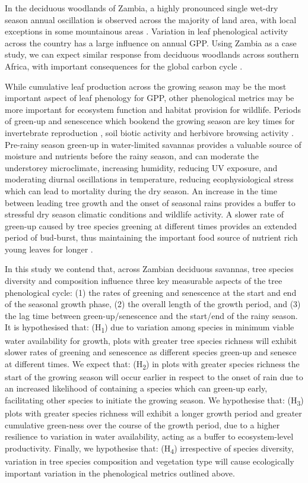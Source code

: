 \documentclass[11pt,a4paper]{article}
\begin{document}
In the deciduous woodlands of Zambia, a highly pronounced single wet-dry season annual oscillation is observed across the majority of land area, with local exceptions in some mountainous areas \citep{}. Variation in leaf phenological activity across the country has a large influence on annual GPP. Using Zambia as a case study, we can expect similar response from deciduous woodlands across southern Africa, with important consequences for the global carbon cycle \citep{}. 

While cumulative leaf production across the growing season may be the most
important aspect of leaf phenology for GPP, other phenological metrics may be
more important for ecosystem function and habitat provision for wildlife.
Periods of green-up and senescence which bookend the growing season are key
times for invertebrate reproduction \citep{}, soil biotic activity \citep{} and
herbivore browsing activity \citep{}. Pre-rainy season green-up in water-limited
savannas provides a valuable source of moisture and nutrients before the rainy
season, and can moderate the understorey microclimate, increasing humidity,
reducing UV exposure, and moderating diurnal oscillations in temperature,
reducing ecophysiological stress which can lead to mortality during the dry
season. An increase in the time between leading tree growth and the onset of
seasonal rains provides a buffer to stressful dry season climatic conditions and
wildlife activity. A slower rate of green-up caused by tree species greening at
different times provides an extended period of bud-burst, thus maintaining the
important food source of nutrient rich young leaves for longer \citep{}. 
 
In this study we contend that, across Zambian deciduous savannas, tree species
diversity and composition influence three key measurable aspects of the tree
phenological cycle: (1) the rates of greening and senescence at the start and
end of the seasonal growth phase, (2) the overall length of the growth period,
and (3) the lag time between green-up/senescence and the start/end of the
rainy season. It is hypothesised that: (H\textsubscript{1}) due to variation
among species in minimum viable water availability for growth, plots with
greater tree species richness will exhibit slower rates of greening and
senescence as different species green-up and senesce at different times. We
expect that: (H\textsubscript{2}) in plots with greater species richness the
start of the growing season will occur earlier in respect to the onset of rain
due to an increased likelihood of containing a species which can green-up
early, facilitating other species to initiate the growing season. We
hypothesise that: (H\textsubscript{3}) plots with greater species richness
will exhibit a longer growth period and greater cumulative green-ness over the
course of the growth period, due to a higher resilience to variation in water
availability, acting as a buffer to ecosystem-level productivity. Finally, we
hypothesise that: (H\textsubscript{4}) irrespective of species diversity,
variation in tree species composition and vegetation type will cause
ecologically important variation in the phenological metrics outlined above. 
\end{document}
